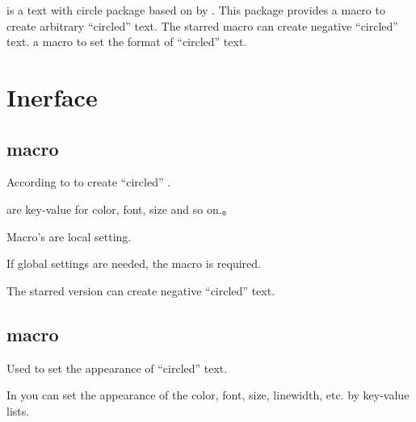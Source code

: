 \documentclass[full]{l3doc}
\begin{document}
\begin{documentation}
 is a text with circle package based on%
 by . This package provides a macro
 to create arbitrary ``circled'' text. The 
starred macro can create negative ``circled'' text.
a macro  to set the format of ``circled''
text.

\section{Inerface}

\subsection{ macro}

\begin{function}{\circledtext}
  \begin{syntax}
      
  \end{syntax}
\end{function}

  According to  to create ``circled''
  .

   are key-value for color, font, size and so on.。

  Macro's  are local setting.

  If global settings are needed, the  macro is required.

  The starred version can create negative ``circled'' text.

\begin{SideBySideExample}[frame=single,numbers=left,xrightmargin=.45\linewidth,gobble=2]
  \centering
  \quad
  \quad
  \quad
\end{SideBySideExample}
\subsection{ macro}

\begin{function}{\circledtextset}
  \begin{syntax}
     
  \end{syntax}
\end{function}

  Used to set the appearance of ``circled'' text.

  In  you can set the appearance of the 
  color, font, size, linewidth, etc. by key-value lists.


\end{documentation}
\end{document}
